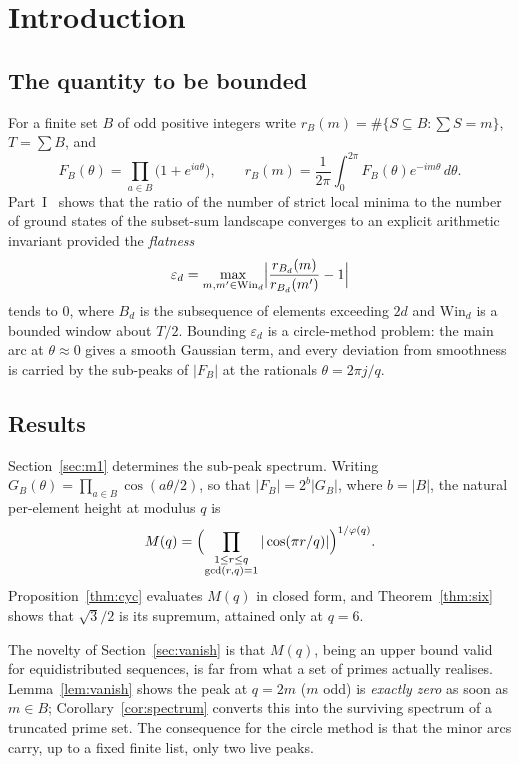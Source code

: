 \documentclass[11pt,a4paper]{article}
\theoremstyle{plain}
\theoremstyle{definition}
\theoremstyle{remark}
\begin{document}
\section{Introduction}

\subsection{The quantity to be bounded}

For a finite set $B$ of odd positive integers write
$r_B(m)=\#\{S\subseteq B:\sum S=m\}$, $T=\sum B$, and
\[
  F_B(\theta)=\prod_{a\in B}\bigl(1+e^{ia\theta}\bigr),
  \qquad
  r_B(m)=\frac1{2\pi}\int_{0}^{2\pi}F_B(\theta)e^{-im\theta}\,d\theta .
\]
Part~I~\cite{P1} shows that the ratio of the number of strict local minima to
the number of ground states of the subset-sum landscape converges to an explicit
arithmetic invariant provided the \emph{flatness}
\[
  \varepsilon_d=\max_{m,m'\in\mathrm{Win}_d}
      \Bigl|\frac{r_{B_d}(m)}{r_{B_d}(m')}-1\Bigr|
\]
tends to $0$, where $B_d$ is the subsequence of elements exceeding $2d$ and
$\mathrm{Win}_d$ is a bounded window about $T/2$. Bounding $\varepsilon_d$ is a
circle-method problem: the main arc at $\theta\approx0$ gives a smooth Gaussian
term, and every deviation from smoothness is carried by the sub-peaks of
$|F_B|$ at the rationals $\theta=2\pi j/q$.

\subsection{Results}

Section~\ref{sec:m1} determines the sub-peak spectrum. Writing
$G_B(\theta)=\prod_{a\in B}\cos(a\theta/2)$, so that $|F_B|=2^{b}|G_B|$, where $b=|B|$, the
natural per-element height at modulus $q$ is
\[
  M(q)=\Bigl(\prod_{\substack{1\le r\le q\\ \gcd(r,q)=1}}|\cos(\pi r/q)|\Bigr)^{1/\varphi(q)} .
\]
Proposition~\ref{thm:cyc} evaluates $M(q)$ in closed form, and
Theorem~\ref{thm:six} shows that $\sqrt3/2$ is its supremum, attained only at
$q=6$.

The novelty of Section~\ref{sec:vanish} is that $M(q)$, being an upper bound
valid for equidistributed sequences, is far from what a set of primes actually
realises. Lemma~\ref{lem:vanish} shows the peak at $q=2m$ ($m$ odd) is
\emph{exactly zero} as soon as $m\in B$; Corollary~\ref{cor:spectrum} converts
this into the surviving spectrum of a truncated prime set. The consequence for
the circle method is that the minor arcs carry, up to a fixed finite list, only
two live peaks.
\end{document}
